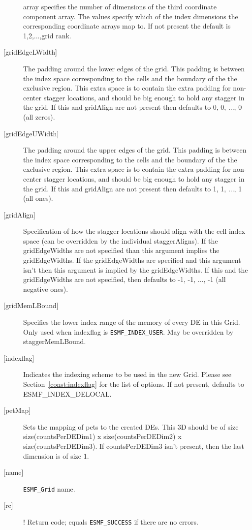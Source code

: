 \begin{description}
       array specifies the number of dimensions of the third
       coordinate component array. The values specify which
       of the index dimensions the corresponding coordinate
       arrays map to. If not present the default is 1,2,...,grid rank.
   \item[{[gridEdgeLWidth]}]
        The padding around the lower edges of the grid. This padding is between
        the index space corresponding to the cells and the boundary of the
        the exclusive region. This extra space is to contain the extra
        padding for non-center stagger locations, and should be big enough
        to hold any stagger in the grid. If this and gridAlign are not present then
        defaults to 0, 0, ..., 0 (all zeros).
   \item[{[gridEdgeUWidth]}]
        The padding around the upper edges of the grid. This padding is between
        the index space corresponding to the cells and the boundary of the
        the exclusive region. This extra space is to contain the extra
        padding for non-center stagger locations, and should be big enough
        to hold any stagger in the grid. If this and gridAlign are not present then
        defaults to 1, 1, ..., 1 (all ones).
   \item[{[gridAlign]}]
       Specification of how the stagger locations should align with the cell
       index space (can be overridden by the individual staggerAligns). If
       the gridEdgeWidths are not specified than this argument
       implies the gridEdgeWidths. If the gridEdgeWidths are specified and this argument isn't
       then this argument is implied by the gridEdgeWidths.
       If this and the gridEdgeWidths are not specified, then defaults to
      -1, -1, ..., -1 (all negative ones).
   \item[{[gridMemLBound]}]
        Specifies the lower index range of the memory of every DE in this Grid.
        Only used when indexflag is {\tt ESMF\_INDEX\_USER}. May be overridden
        by staggerMemLBound.
   \item[{[indexflag]}]
        Indicates the indexing scheme to be used in the new Grid. Please see
        Section~\ref{const:indexflag} for the list of options. If not present,
        defaults to ESMF\_INDEX\_DELOCAL.
   \item[{[petMap]}]
         \begin{sloppypar}
         Sets the mapping of pets to the created DEs. This 3D
         should be of size size(countsPerDEDim1) x size(countsPerDEDim2) x
         size(countsPerDEDim3). If countsPerDEDim3 isn't present, then
         the last dimension is of size 1.
         \end{sloppypar}
   \item[{[name]}]
            {\tt ESMF\_Grid} name.
   \item[{[rc]}]
  !      Return code; equals {\tt ESMF\_SUCCESS} if there are no errors.
   \end{description}
   

